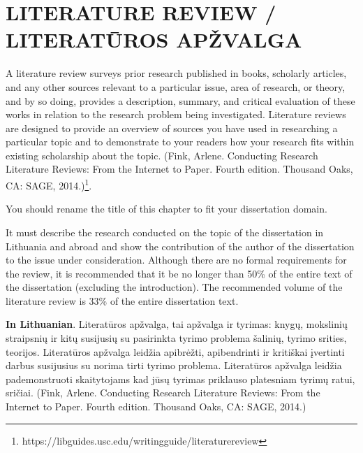
\setcounter{chapter}{0}

\chapter{\MakeUppercase{Literature review / Literatūros apžvalga}} %
\label{cha:review}


A literature review surveys prior research published in books, scholarly articles, and any other sources relevant to a particular issue, area of research, or theory, and by so doing, provides a description, summary, and critical evaluation of these works in relation to the research problem being investigated. Literature reviews are designed to provide an overview of sources you have used in researching a particular topic and to demonstrate to your readers how your research fits within existing scholarship about the topic.  (Fink, Arlene. Conducting Research Literature Reviews: From the Internet to Paper. Fourth edition. Thousand Oaks, CA: SAGE, 2014.)\footnote{https://libguides.usc.edu/writingguide/literaturereview}. 

You should rename the title of this chapter to fit your dissertation domain. 

It must describe the research conducted on the topic of the dissertation in Lithuania and abroad and show the contribution of the author of the dissertation to the issue under consideration.
Although there are no formal requirements for the review, it is recommended that it be no longer than 50\% of the entire text of the dissertation (excluding the introduction). The recommended volume of the literature review is 33\% of the entire dissertation text.

\textbf{In Lithuanian}. Literatūros apžvalga, tai apžvalga ir tyrimas: knygų, mokslinių straipsnių ir kitų susijusių su pasirinkta tyrimo problema šalinių, tyrimo srities, teorijos. 
Literatūros apžvalga leidžia apibrėžti, apibendrinti ir kritiškai įvertinti darbus susijusius su norima tirti tyrimo problema.
Literatūros apžvalga leidžia pademonstruoti skaitytojams kad jūsų tyrimas priklauso platesniam tyrimų ratui, sričiai. (Fink, Arlene. Conducting Research Literature Reviews: From the Internet to Paper. Fourth edition. Thousand Oaks, CA: SAGE, 2014.) 


